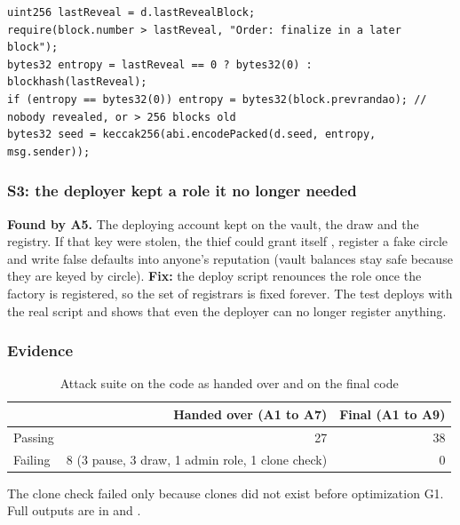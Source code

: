\begin{lstlisting}[language=Solidity]
uint256 lastReveal = d.lastRevealBlock;
require(block.number > lastReveal, "Order: finalize in a later block");
bytes32 entropy = lastReveal == 0 ? bytes32(0) : blockhash(lastReveal);
if (entropy == bytes32(0)) entropy = bytes32(block.prevrandao); // nobody revealed, or > 256 blocks old
bytes32 seed = keccak256(abi.encodePacked(d.seed, entropy, msg.sender));
\end{lstlisting}

\subsubsection{S3: the deployer kept a role it no longer needed}
\textbf{Found by A5.} The deploying account kept  on the vault, the draw and
the registry. If that key were stolen, the thief could grant itself , register a
fake circle and write false defaults into anyone's reputation (vault balances stay safe because they are
keyed by circle). \textbf{Fix:} the deploy script renounces the role once the factory is registered, so
the set of registrars is fixed forever. The test deploys with the real script and shows that even the
deployer can no longer register anything.

\subsubsection{Evidence}
\begin{table}[H]
\centering\small
\caption{Attack suite on the code as handed over and on the final code}
\label{tab:beforeafter}
\begin{tabular}{@{}lrr@{}}
\toprule
 & Handed over (A1 to A7) & Final (A1 to A9) \\
\midrule
Passing & 27 & 38 \\
Failing & 8 (3 pause, 3 draw, 1 admin role, 1 clone check) & 0 \\
\bottomrule
\end{tabular}
\end{table}
The clone check failed only because clones did not exist before optimization G1. Full outputs are in
 and .


